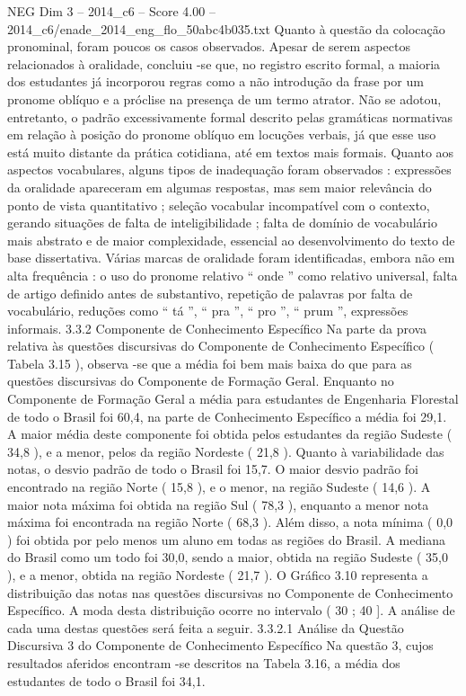 \begin{textsample}{NEG Dim 3 – 2014\_c6 – Score 4.00 – 2014\_c6/enade\_2014\_eng\_flo\_50abc4b035.txt}
Quanto à questão da colocação pronominal, foram poucos os casos observados.
Apesar de serem aspectos relacionados à oralidade, concluiu -se que, no registro escrito formal, a maioria dos estudantes já incorporou regras como a não introdução da frase por um pronome oblíquo e a próclise na presença de um termo atrator.
Não se adotou, entretanto, o padrão excessivamente formal descrito pelas gramáticas normativas em relação à posição do pronome oblíquo em locuções verbais, já que esse uso está muito distante da prática cotidiana, até em textos mais formais.
Quanto aos aspectos vocabulares, alguns tipos de inadequação foram observados : expressões da oralidade apareceram em algumas respostas, mas sem maior relevância do ponto de vista quantitativo ; seleção vocabular incompatível com o contexto, gerando situações de falta de inteligibilidade ; falta de domínio de vocabulário mais abstrato e de maior complexidade, essencial ao desenvolvimento do texto de base dissertativa.
Várias marcas de oralidade foram identificadas, embora não em alta frequência : o uso do pronome relativo “ onde ” como relativo universal, falta de artigo definido antes de substantivo, repetição de palavras por falta de vocabulário, reduções como “ tá ”, “ pra ”, “ pro ”, “ prum ”, expressões informais. 3.3.2 Componente de Conhecimento Específico Na parte da prova relativa às questões discursivas do Componente de Conhecimento Específico ( Tabela 3.15 ), observa -se que a média foi bem mais baixa do que para as questões discursivas do Componente de Formação Geral.
Enquanto no Componente de Formação Geral a média para estudantes de Engenharia Florestal de todo o Brasil foi 60,4, na parte de Conhecimento Específico a média foi 29,1.
A maior média deste componente foi obtida pelos estudantes da região Sudeste ( 34,8 ), e a menor, pelos da região Nordeste ( 21,8 ).
Quanto à variabilidade das notas, o desvio padrão de todo o Brasil foi 15,7.
O maior desvio padrão foi encontrado na região Norte ( 15,8 ), e o menor, na região Sudeste ( 14,6 ).
A maior nota máxima foi obtida na região Sul ( 78,3 ), enquanto a menor nota máxima foi encontrada na região Norte ( 68,3 ).
Além disso, a nota mínima ( 0,0 ) foi obtida por pelo menos um aluno em todas as regiões do Brasil.
A mediana do Brasil como um todo foi 30,0, sendo a maior, obtida na região Sudeste ( 35,0 ), e a menor, obtida na região Nordeste ( 21,7 ).
O Gráfico 3.10 representa a distribuição das notas nas questões discursivas no Componente de Conhecimento Específico.
A moda desta distribuição ocorre no intervalo ( 30 ; 40 ].
A análise de cada uma destas questões será feita a seguir. 3.3.2.1 Análise da Questão Discursiva 3 do Componente de Conhecimento Específico Na questão 3, cujos resultados aferidos encontram -se descritos na Tabela 3.16, a média dos estudantes de todo o Brasil foi 34,1.

\end{textsample}
